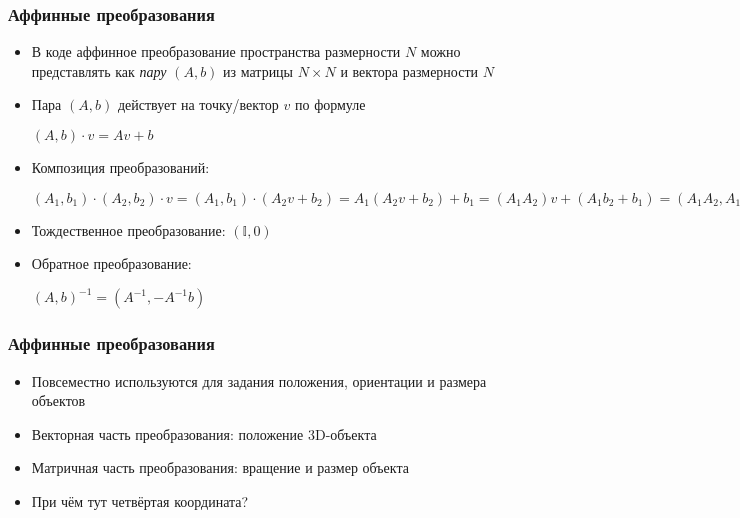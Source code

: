 \documentclass[10pt]{beamer}
\begin{document}
\begin{frame}[fragile]
\frametitle{Аффинные преобразования}
\begin{itemize}
\item В коде аффинное преобразование пространства размерности \begin{math}N\end{math} можно представлять как \textit{пару} \begin{math}(A,b)\end{math} из матрицы \begin{math}N\times N\end{math} и вектора размерности \begin{math}N\end{math}
\pause
\item Пара \begin{math}(A,b)\end{math} действует на точку/вектор \begin{math}v\end{math} по формуле

\begin{math}(A, b) \cdot v = Av + b\end{math}
\pause
\item Композиция преобразований:

\begin{math}(A_1, b_1) \cdot (A_2, b_2) \cdot v = (A_1, b_1) \cdot (A_2 v + b_2) = A_1 (A_2 v + b_2) + b_1 = (A_1 A_2) v + (A_1 b_2 + b_1) = (A_1 A_2, A_1 b_2 + b_1) \cdot v\end{math}
\pause
\item Тождественное преобразование:
\begin{math}(\mathbb I, 0)\end{math}
\pause
\item Обратное преобразование:

\begin{math}(A, b)^{-1} = (A^{-1}, -A^{-1}b)\end{math}
\end{itemize}
\end{frame}

\begin{frame}[fragile]
\frametitle{Аффинные преобразования}
\begin{itemize}
\item Повсеместно используются для задания положения, ориентации и размера объектов
\pause
\item Векторная часть преобразования: положение 3D-объекта
\pause
\item Матричная часть преобразования: вращение и размер объекта
\pause
\item При чём тут четвёртая координата?
\end{itemize}
\end{frame}
\end{document}
